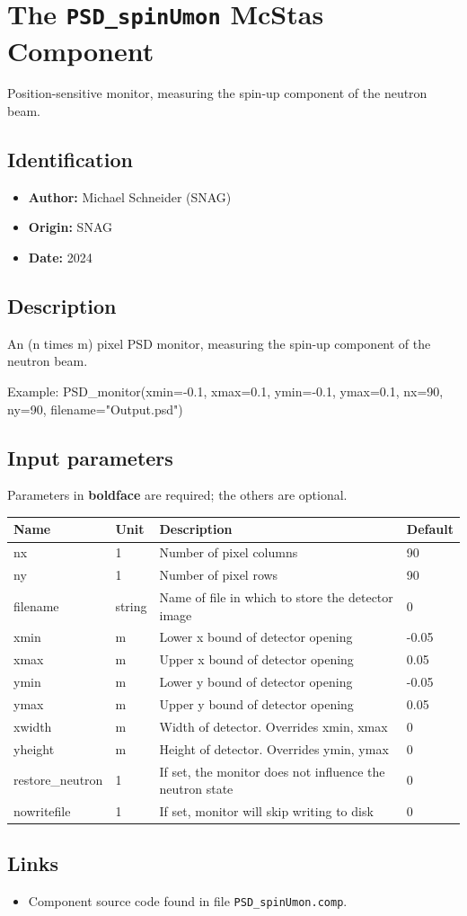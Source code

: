 \section{The \texttt{PSD\_spinUmon} McStas Component}
Position-sensitive monitor, measuring the spin-up component of the neutron beam.

\subsection*{Identification}
\begin{itemize}
  \item \textbf{Author:} Michael Schneider (SNAG)
  \item \textbf{Origin:} SNAG
  \item \textbf{Date:} 2024
\end{itemize}

\subsection*{Description}
An (n times m) pixel PSD monitor, measuring the spin-up component of the neutron beam.

Example: PSD\_monitor(xmin=-0.1, xmax=0.1, ymin=-0.1, ymax=0.1, nx=90, ny=90, filename="Output.psd")

\subsection*{Input parameters}
Parameters in \textbf{boldface} are required; the others are optional.

\begin{longtable}{p{}p{}p{}p{}}
\toprule
\textbf{Name} & \textbf{Unit} & \textbf{Description} & \textbf{Default} \\
\midrule
\endhead
nx & 1 & Number of pixel columns & 90 \\
ny & 1 & Number of pixel rows & 90 \\
filename & string & Name of file in which to store the detector image & 0 \\
xmin & m & Lower x bound of detector opening & -0.05 \\
xmax & m & Upper x bound of detector opening & 0.05 \\
ymin & m & Lower y bound of detector opening & -0.05 \\
ymax & m & Upper y bound of detector opening & 0.05 \\
xwidth & m & Width of detector. Overrides xmin, xmax & 0 \\
yheight & m & Height of detector. Overrides ymin, ymax & 0 \\
restore\_neutron & 1 & If set, the monitor does not influence the neutron state & 0 \\
nowritefile & 1 & If set, monitor will skip writing to disk & 0 \\
\bottomrule
\end{longtable}

\subsection*{Links}
\begin{itemize}
  \item Component source code found in file \texttt{PSD\_spinUmon.comp}.
\end{itemize}
